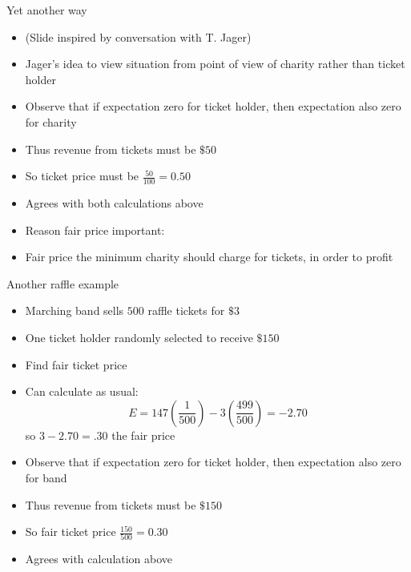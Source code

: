 \begin{frame}{Yet another way}
\begin{itemize}
\item (Slide inspired by conversation with T. Jager)
\item Jager's idea to view situation from point of view
of charity rather than ticket holder
\item Observe that if expectation zero for ticket holder,
then expectation also zero for charity 
\item Thus revenue from tickets must be $\$50$
\item So ticket price must be $\frac{50}{100}=0.50$
\item Agrees with both calculations above
\end{itemize}
\begin{remark}
\begin{itemize}
\item Reason fair price important:
\item Fair price the \alert{minimum} charity should
charge for tickets, in order to profit
\end{itemize}
\end{remark}
\end{frame}

\begin{frame}{Another raffle example}
\begin{itemize}
\item Marching band sells $500$ raffle tickets for $\$3$
\item One ticket holder randomly selected to receive $\$150$
\item Find fair ticket price
\item Can calculate as usual:
\[E=147\left(\frac{1}{500}\right)-3\left(\frac{499}{500}\right)=-2.70\]
so $3-2.70=.30$ the fair price
\item Observe that if expectation zero for ticket holder,
then expectation also zero for band
\item Thus revenue from tickets must be $\$150$
\item So fair ticket price $\frac{150}{500}=0.30$
\item Agrees with calculation above
\end{itemize}
\end{frame}

